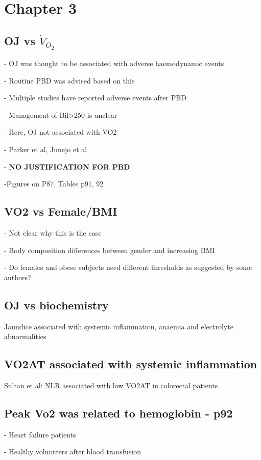 \documentclass[12pt,a4paper]{article}
\author{Vishnu V Chandrabalan}
\begin{document}
\section{Chapter 3}

\subsection{OJ vs $\dot{V}_{O_2}$}
	- OJ was thought to be associated with adverse haemodynamic events

	- Routine PBD was advised based on this

	- Multiple studies have reported adverse events after PBD

	- Management of Bil>250 is unclear

	- Here, OJ not associated with VO2

	- Parker et al, Junejo et al

	- \textbf{NO JUSTIFICATION FOR PBD}

	-Figures on P87, Tables p91, 92

\subsection{VO2 vs Female/BMI}
	- Not clear why this is the case

	- Body composition differences between gender and increasing BMI

	- Do females and obese subjects need different thresholds as suggested by some authors?

\subsection{OJ vs biochemistry}
	Jaundice associated with systemic inflammation, anaemia and electrolyte abnormalities 

\subsection{ VO2AT associated with systemic inflammation}
	Sultan et al: NLR associated with low VO2AT in colorectal patients
	
\subsection{Peak Vo2 was related to hemoglobin - p92}
	- Heart failure patients

	- Healthy volunteers after blood transfusion
\end{document}
